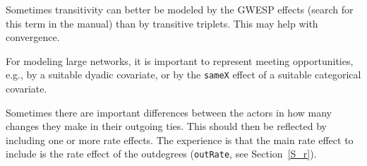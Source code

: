 \documentclass[a4paper,fleqn,11pt]{article}
\newcommand{\+}{\, + \,}
\begin{document}
\begin{itemize}
      Sometimes transitivity can better be modeled by the GWESP effects
      (search for this term in the manual) than by transitive triplets.
      This may help with convergence.

      For modeling large networks, it is important to represent
      meeting opportunities, e.g., by a suitable dyadic covariate,
      or by the \texttt{sameX} effect of a suitable categorical covariate.

      Sometimes there are important differences between the actors in how many
      changes they make in their outgoing ties. This should then
      be reflected by including one or more rate effects.
      The experience is that the main rate effect to include
      is the rate effect of the outdegrees (\texttt{outRate},
      see Section~\ref{S_r}).


\end{itemize}
\end{document}

